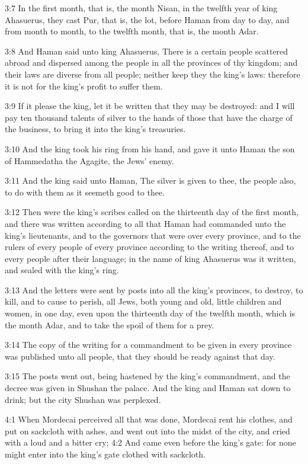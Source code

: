 3:7 In the first month, that is, the month Nisan, in the twelfth year
of king Ahasuerus, they cast Pur, that is, the lot, before Haman from
day to day, and from month to month, to the twelfth month, that is,
the month Adar.

3:8 And Haman said unto king Ahasuerus, There is a certain people
scattered abroad and dispersed among the people in all the provinces
of thy kingdom; and their laws are diverse from all people; neither
keep they the king's laws: therefore it is not for the king's profit
to suffer them.

3:9 If it please the king, let it be written that they may be
destroyed: and I will pay ten thousand talents of silver to the hands
of those that have the charge of the business, to bring it into the
king's treasuries.

3:10 And the king took his ring from his hand, and gave it unto Haman
the son of Hammedatha the Agagite, the Jews' enemy.

3:11 And the king said unto Haman, The silver is given to thee, the
people also, to do with them as it seemeth good to thee.

3:12 Then were the king's scribes called on the thirteenth day of the
first month, and there was written according to all that Haman had
commanded unto the king's lieutenants, and to the governors that were
over every province, and to the rulers of every people of every
province according to the writing thereof, and to every people after
their language; in the name of king Ahasuerus was it written, and
sealed with the king's ring.

3:13 And the letters were sent by posts into all the king's provinces,
to destroy, to kill, and to cause to perish, all Jews, both young and
old, little children and women, in one day, even upon the thirteenth
day of the twelfth month, which is the month Adar, and to take the
spoil of them for a prey.

3:14 The copy of the writing for a commandment to be given in every
province was published unto all people, that they should be ready
against that day.

3:15 The posts went out, being hastened by the king's commandment, and
the decree was given in Shushan the palace. And the king and Haman sat
down to drink; but the city Shushan was perplexed.

4:1 When Mordecai perceived all that was done, Mordecai rent his
clothes, and put on sackcloth with ashes, and went out into the midst
of the city, and cried with a loud and a bitter cry; 4:2 And came even
before the king's gate: for none might enter into the king's gate
clothed with sackcloth.


